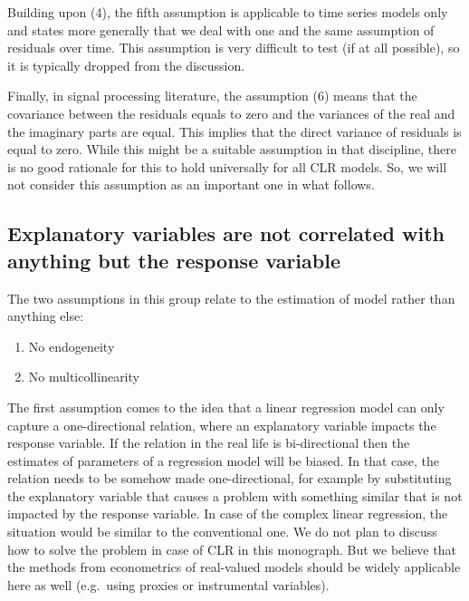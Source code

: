 \documentclass[
]{book}
\providecommand{\tightlist}{%
  \setlength{\itemsep}{0pt}\setlength{\parskip}{0pt}}
\begin{document}
Building upon (4), the fifth assumption is applicable to time series models only and states more generally that we deal with one and the same assumption of residuals over time. This assumption is very difficult to test (if at all possible), so it is typically dropped from the discussion.

Finally, in signal processing literature, the assumption (6) means that the covariance between the residuals equals to zero and the variances of the real and the imaginary parts are equal. This implies that the direct variance of residuals is equal to zero. While this might be a suitable assumption in that discipline, there is no good rationale for this to hold universally for all CLR models. So, we will not consider this assumption as an important one in what follows.

\hypertarget{explanatory-variables-are-not-correlated-with-anything-but-the-response-variable}{%
\subsection{Explanatory variables are not correlated with anything but the response variable}\label{explanatory-variables-are-not-correlated-with-anything-but-the-response-variable}}

The two assumptions in this group relate to the estimation of model rather than anything else:

\begin{enumerate}
\def\labelenumi{\arabic{enumi}.}
\tightlist
\item
  No endogeneity
\item
  No multicollinearity
\end{enumerate}

The first assumption comes to the idea that a linear regression model can only capture a one-directional relation, where an explanatory variable impacts the response variable. If the relation in the real life is bi-directional then the estimates of parameters of a regression model will be biased. In that case, the relation needs to be somehow made one-directional, for example by substituting the explanatory variable that causes a problem with something similar that is not impacted by the response variable. In case of the complex linear regression, the situation would be similar to the conventional one. We do not plan to discuss how to solve the problem in case of CLR in this monograph. But we believe that the methods from econometrics of real-valued models should be widely applicable here as well (e.g.~using proxies or instrumental variables).
\end{document}
